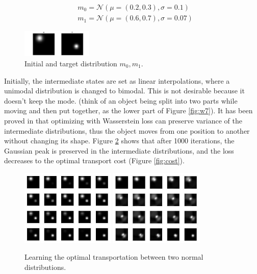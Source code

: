 \documentclass{article}
\begin{document}
\begin{equation}
\begin{aligned}
&m_0 = \mathcal{N}(\mu = (0.2,0.3), \sigma = 0.1) \\
&m_1 = \mathcal{N}(\mu = (0.6,0.7), \sigma = 0.07)
\end{aligned}
\end{equation}

\begin{figure}[htb!]
\centering
\includegraphics[width=0.3\textwidth]{FIGDRG/f0f1}
\caption{Initial and target distribution $m_0, m_1$.}
\label{fig:f0f1}
\end{figure}

Initially, the intermediate states are set as linear interpolations, where a unimodal distribution is changed to bimodal. This is not desirable because it doesn't keep the mode. (think of an object being split into two parts while moving and then put together, as the lower part of Figure \ref{fig:w7}). It has been proved in \cite{DBLP:journals/corr/GatysEB15a} that optimizing with Wasserstein loss can preserve variance of the intermediate distributions, thus the object moves from one position to another without changing its shape. Figure \ref{fig:iter} shows that after 1000 iterations, the Gaussian peak is preserved in the intermediate distributions, and the loss decreases to the optimal transport cost (Figure \ref{fig:cost}).

\begin{figure}[htb!]
\centering
{\includegraphics[width=0.4\textwidth]{FIGDRG/iter0}
}
\hfil
{\includegraphics[width=0.4\textwidth]{FIGDRG/iter1000}
\\ \qquad {} \qquad {}
}
\caption{Learning the optimal transportation between two normal distributions.}
\label{fig:iter}
\end{figure}
\end{document}
